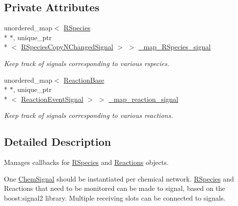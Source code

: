 \subsection*{Private Attributes}
\begin{DoxyCompactItemize}
\item 
unordered\+\_\+map$<$ \hyperlink{classRSpecies}{R\+Species} \\*
$\ast$, unique\+\_\+ptr\\*
$<$ \hyperlink{Signaling_8h_a0e8f1e8752c518bbfbcfe0147eca4587}{R\+Species\+Copy\+N\+Changed\+Signal} $>$ $>$ \hyperlink{classChemSignal_a01513b0756cb765b0fd02a7e5497133d}{\+\_\+map\+\_\+\+R\+Species\+\_\+signal}
\begin{DoxyCompactList}\small\item\em Keep track of signals corresponding to various rspecies. \end{DoxyCompactList}\item 
unordered\+\_\+map$<$ \hyperlink{classReactionBase}{Reaction\+Base} \\*
$\ast$, unique\+\_\+ptr\\*
$<$ \hyperlink{Signaling_8h_a474e8de96ad1d2e184edd4655b5367a5}{Reaction\+Event\+Signal} $>$ $>$ \hyperlink{classChemSignal_a750129c5a876c652e76e2a008b21b276}{\+\_\+map\+\_\+reaction\+\_\+signal}
\begin{DoxyCompactList}\small\item\em Keep track of signals corresponding to various reactions. \end{DoxyCompactList}\end{DoxyCompactItemize}


\subsection{Detailed Description}
Manages callbacks for \hyperlink{classRSpecies}{R\+Species} and \hyperlink{classReaction}{Reactions} objects. 

One \hyperlink{classChemSignal}{Chem\+Signal} should be instantiated per chemical network. \hyperlink{classRSpecies}{R\+Species} and Reactions that need to be monitored can be made to signal, based on the boost\+:signal2 library. Multiple receiving slots can be connected to signals.

